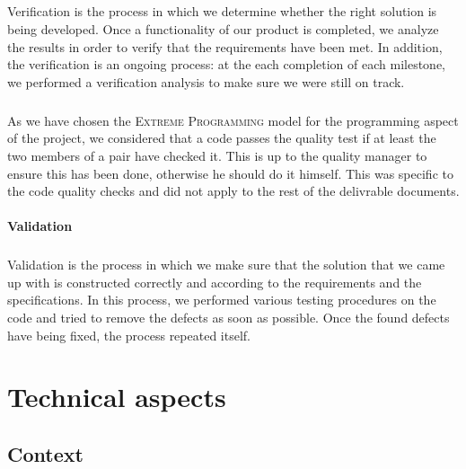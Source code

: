 \documentclass{report}
\begin{document}
\paragraph{}
\hspace{4mm}Verification is the process in which we determine
whether the right solution is being developed.
Once a functionality of our product is completed, 
we analyze the results in order to
 verify that the requirements have been met. 
 In addition, the verification is an ongoing process:
 at the each completion of each milestone, 
we performed a verification analysis to make 
sure we were still on track.

\paragraph{}
\hspace{4mm}As we have chosen the \textsc{Extreme Programming} model for the programming 
aspect of the project, we considered that a code passes
 the quality test if at least the two members of a pair have checked 
it. This is up to the quality manager to ensure this has been done, 
otherwise he should do it himself. This was specific to the code quality 
checks and did not apply to the rest of the delivrable documents.

\subsubsection{Validation}

\paragraph{}
\hspace{4mm}Validation is the process in which we make sure that the solution
that we came up with is 
constructed correctly and according to the requirements 
and the specifications.
In this process, we performed various testing procedures on
 the code and tried to remove the defects as soon as possible. 
Once the found defects have being fixed, the process repeated itself.

\chapter{Technical aspects}

\section{Context}
\end{document}
